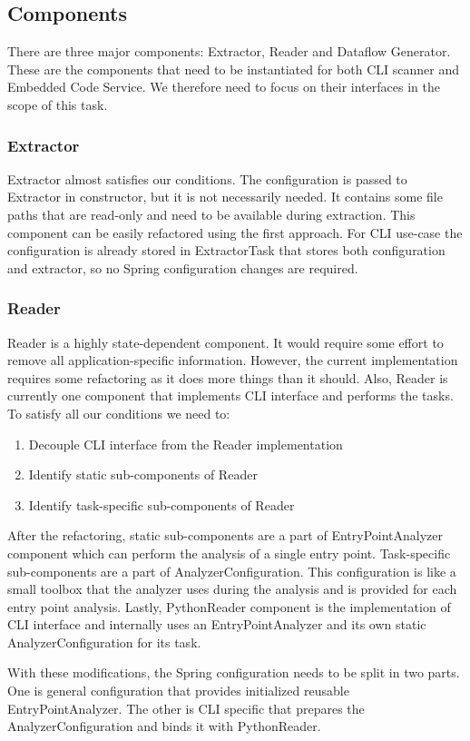 \subsection{Components}
There are three major components: Extractor, Reader and Dataflow Generator. These are the components that need to be instantiated for both CLI scanner and Embedded Code Service. We therefore need to focus on their interfaces in the scope of this task.

\subsubsection{Extractor}
Extractor almost satisfies our conditions. The configuration is passed to Extractor in constructor, but it is not necessarily needed. It contains some file paths that are read-only and need to be available during extraction. This component can be easily refactored using the first approach. For CLI use-case the configuration is already stored in ExtractorTask that stores both configuration and extractor, so no Spring configuration changes are required.

\subsubsection{Reader}
Reader is a highly state-dependent component. It would require some effort to remove all application-specific information. However, the current implementation requires some refactoring as it does more things than it should. Also, Reader is currently one component that implements CLI interface and performs the tasks. To satisfy all our conditions we need to:
\begin{enumerate}
    \item Decouple CLI interface from the Reader implementation
    \item Identify static sub-components of Reader
    \item Identify task-specific sub-components of Reader
\end{enumerate}
After the refactoring, static sub-components are a part of EntryPointAnalyzer component which can perform the analysis of a single entry point. Task-specific sub-components are a part of AnalyzerConfiguration. This configuration is like a small toolbox that the analyzer uses during the analysis and is provided for each entry point analysis. Lastly, PythonReader component is the implementation of CLI interface and internally uses an EntryPointAnalyzer and its own static AnalyzerConfiguration for its task. 
\par
With these modifications, the Spring configuration needs to be split in two parts. One is general configuration that provides initialized reusable EntryPointAnalyzer. The other is CLI specific that prepares the AnalyzerConfiguration and binds it with PythonReader.

